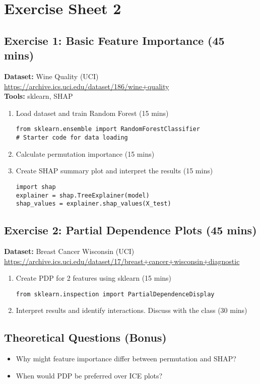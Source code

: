 \chapter*{Exercise Sheet 2}
\section*{Exercise 1: Basic Feature Importance (45 mins)}
\textbf{Dataset:} Wine Quality (UCI) \\
\url{https://archive.ics.uci.edu/dataset/186/wine+quality} \\
\textbf{Tools:} sklearn, SHAP

\begin{enumerate}
\item Load dataset and train Random Forest (15 mins)
\begin{verbatim}
from sklearn.ensemble import RandomForestClassifier
# Starter code for data loading
\end{verbatim}

\item Calculate permutation importance (15 mins)
\item Create SHAP summary plot and interpret the results (15 mins)
\begin{verbatim}
import shap
explainer = shap.TreeExplainer(model)
shap_values = explainer.shap_values(X_test)
\end{verbatim}
\end{enumerate}

\section*{Exercise 2: Partial Dependence Plots (45 mins)}
\textbf{Dataset:} Breast Cancer Wisconsin (UCI) \\
\url{https://archive.ics.uci.edu/dataset/17/breast+cancer+wisconsin+diagnostic}\\

\begin{enumerate}
\item Create PDP for 2 features using sklearn (15 mins)
\begin{verbatim}
from sklearn.inspection import PartialDependenceDisplay
\end{verbatim}

\item Interpret results and identify interactions. Discuss with the class (30 mins)
\end{enumerate}

\section*{Theoretical Questions (Bonus)}
\begin{itemize}
\item Why might feature importance differ between permutation and SHAP?
\item When would PDP be preferred over ICE plots?
\end{itemize}
